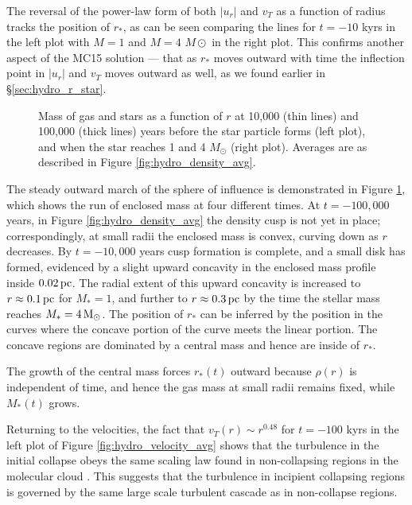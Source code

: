 \documentclass[../dissertation.tex]{subfiles}
\begin{document}
The reversal of the power-law form of both $|u_r|$ and 
$v_T$ as a function of radius tracks 
the position of $r_*$, as can be seen
comparing the lines for $t=-10$ kyrs in the left
plot with $M=1$ and $M=4$ $M\odot$ in the right plot. This confirms another
aspect of the MC15 solution --- that as $r_*$ moves outward with time the 
inflection point in $|u_r|$ and $v_T$ moves outward as well, as we found
earlier in \S \ref{sec:hydro_r_star}.

\begin{figure*}[htb] %
\caption[Hydro run of Mass]{Mass of gas and stars as a function of $r$ at 10,000 (thin lines) 
and 100,000 (thick lines) years before the star particle forms (left plot), 
and when the star reaches 1 and 4 $M_{\odot}$ (right plot). Averages 
are as described in Figure \ref{fig:hydro_density_avg}. \label{fig:hydro_mass_avg}}
\end{figure*}

The steady outward march of the sphere of influence 
is demonstrated in Figure \ref{fig:hydro_mass_avg}, 
which shows the run of enclosed mass at four different times.  
At $t=-100,000$ years, in Figure \ref{fig:hydro_density_avg} the density cusp is not yet in place; 
correspondingly, at small radii
the enclosed mass is convex, curving down as $r$ decreases. By $t=-10,000$
years cusp formation is complete, and a small disk has formed, evidenced by a slight
upward concavity in the enclosed mass profile inside $0.02\,\rm pc$.  
The radial extent of this upward concavity is increased to $r\approx 0.1\,\rm pc$ 
for $M_*=1$, and further to $r\approx0.3\,\rm pc$ by the time the stellar mass reaches 
$M_*=4\,{\rm M}_{\odot}$. The position of $r_*$ can be inferred by the position 
in the curves where the concave portion of the curve meets the linear portion.  
The concave regions are dominated by a central mass and hence are inside of $r_*$.  

The growth of the central mass forces $r_*(t)$ outward because $\rho(r)$ 
is independent of time, and hence the gas mass at small radii remains fixed, while
$M_*(t)$ grows. 

Returning to the velocities, the fact that $v_T(r) \sim r^{0.48}$ for $t=-100$ kyrs in the left plot of Figure \ref{fig:hydro_velocity_avg} shows that the 
turbulence in the 
initial collapse obeys the same scaling law found in non-collapsing
regions in the molecular cloud \citep{2015ApJ...800...49L}.  
This suggests that the turbulence in incipient collapsing 
regions is governed by the same large scale turbulent cascade as in 
non-collapse regions. 
\end{document}
